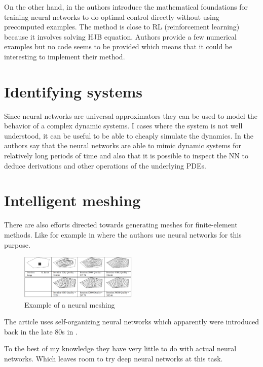 \documentclass{article}
\begin{document}
On the other hand, in \cite{kunisch} the authors introduce the mathematical foundations for training neural networks to do optimal control directly without using precomputed examples.
The method is close to RL (reinforcement learning) because it involves solving HJB equation.
Authors provide a few numerical examples but no code seems to be provided which means that it could be interesting to implement their method.



\section{Identifying systems}

Since neural networks are universal approximators they can be used to model the behavior of a complex dynamic systems. 
I cases where the system is not well understood, it can be useful to be able to cheaply simulate the dynamics. 
In \cite{long2017pdenet} the authors say that the neural networks are able to mimic dynamic systems for relatively long periods of time and also that it is possible to inspect the NN to deduce derivations and other operations of the underlying PDEs.


\section{Intelligent meshing}

There are also efforts directed towards generating meshes for finite-element methods.
Like for example in \cite{meshing} where the authors use neural networks for this purpose.

\begin{figure}[h]
\caption{Example of a neural meshing}
\centering
\includegraphics[width=0.5\textwidth]{meshing}
\end{figure}

The article uses self-organizing neural networks which apparently were introduced back in the late 80s in \cite{kohonen2012self}.

To the best of my knowledge they have very little to do with actual neural networks.
Which leaves room to try deep neural networks at this task.
\end{document}
